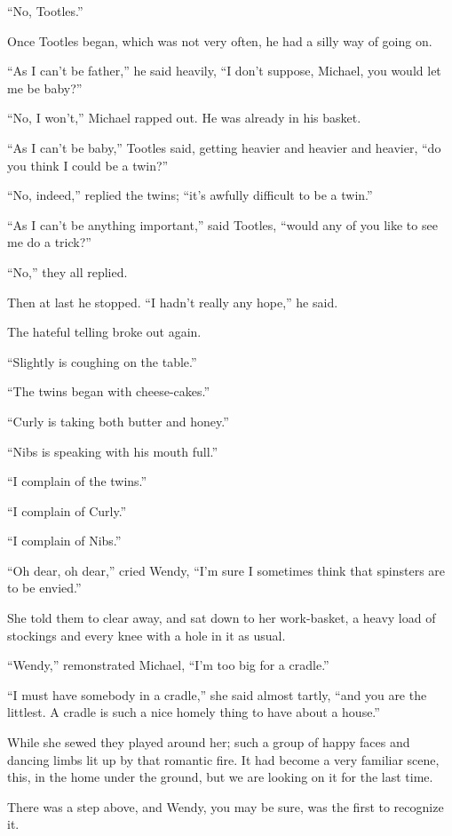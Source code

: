 ``No, Tootles.''

Once Tootles began, which was not very often, he had a silly way of
going on.

``As I can't be father,'' he said heavily, ``I don't suppose, Michael, you
would let me be baby?''

``No, I won't,'' Michael rapped out. He was already in his basket.

``As I can't be baby,'' Tootles said, getting heavier and heavier and
heavier, ``do you think I could be a twin?''

``No, indeed,'' replied the twins; ``it's awfully difficult to be a twin.''

``As I can't be anything important,'' said Tootles, ``would any of you
like to see me do a trick?''

``No,'' they all replied.

Then at last he stopped. ``I hadn't really any hope,'' he said.

The hateful telling broke out again.

``Slightly is coughing on the table.''

``The twins began with cheese-cakes.''

``Curly is taking both butter and honey.''

``Nibs is speaking with his mouth full.''

``I complain of the twins.''

``I complain of Curly.''

``I complain of Nibs.''

``Oh dear, oh dear,'' cried Wendy, ``I'm sure I sometimes think that
spinsters are to be envied.''

She told them to clear away, and sat down to her work-basket, a heavy
load of stockings and every knee with a hole in it as usual.

``Wendy,'' remonstrated Michael, ``I'm too big for a cradle.''

``I must have somebody in a cradle,'' she said almost tartly, ``and you
are the littlest. A cradle is such a nice homely thing to have about a
house.''

While she sewed they played around her; such a group of happy faces and
dancing limbs lit up by that romantic fire. It had become a very
familiar scene, this, in the home under the ground, but we are looking
on it for the last time.

There was a step above, and Wendy, you may be sure, was the first to
recognize it.


